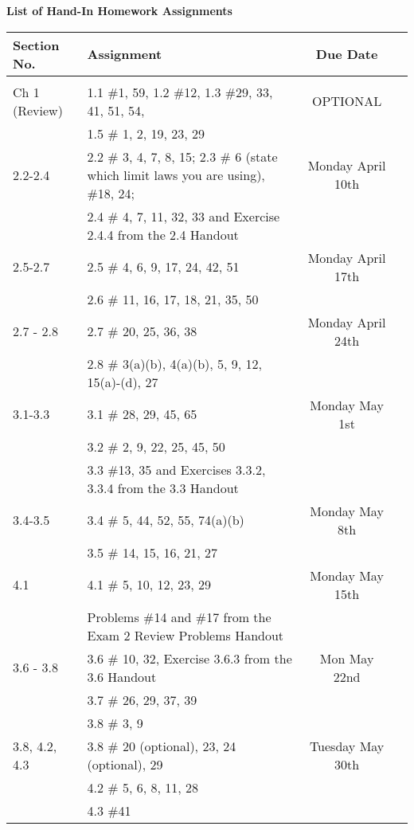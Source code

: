 \documentclass{article}
\begin{document}
\begin{center}
{\bf List of Hand-In Homework Assignments}
\end{center}

\begin{center}
\begin{tabular}{l l c l }
Section No. & Assignment  & Due Date  \\
\hline\\
Ch 1 (Review) & 1.1 \#1, 59, 1.2 \#12, 1.3 \#29, 33, 41, 51, 54,  & OPTIONAL \\
 & 1.5 \# 1, 2, 19, 23, 29 & \\
2.2-2.4 & 2.2 \# 3, 4, 7, 8, 15; 2.3 \# 6 (state which limit laws you are using), \#18, 24; & Monday April 10th \\
&  2.4 \# 4, 7, 11, 32, 33 and Exercise 2.4.4 from the 2.4 Handout   & \\

2.5-2.7 & 2.5 \# 4, 6, 9, 17, 24, 42, 51& Monday April 17th  \\
& 2.6 \# 11, 16, 17, 18, 21, 35, 50 & \\
2.7 - 2.8 &  2.7 \# 20, 25, 36, 38 & Monday April 24th \\
 & 2.8 \# 3(a)(b), 4(a)(b), 5, 9, 12, 15(a)-(d), 27 \\
  3.1-3.3 & 3.1 \# 28, 29, 45, 65  & Monday May 1st \\
   & 3.2 \# 2, 9, 22, 25, 45, 50 & \\
  & 3.3 \#13, 35 and Exercises 3.3.2, 3.3.4 from the 3.3 Handout & \\
  
   3.4-3.5 & 3.4 \# 5, 44, 52, 55, 74(a)(b) & Monday May 8th \\
    & 3.5 \# 14, 15, 16, 21, 27 &\\
    
    4.1 & 4.1 \# 5, 10, 12, 23, 29 & Monday May 15th \\
    & Problems \#14 and \#17 from the Exam 2 Review Problems Handout & \\
    
    3.6 - 3.8  & 3.6 \# 10, 32, Exercise 3.6.3 from the 3.6 Handout &Mon May 22nd \\
    & 3.7 \# 26, 29, 37, 39 & \\
& 3.8 \# 3, 9 &  \\

3.8, 4.2, 4.3 & 3.8 \#  20 (optional), 23, 24 (optional), 29 & Tuesday May 30th \\
 & 4.2 \# 5, 6, 8, 11, 28 & \\
 & 4.3 \#41 & \\
 

\end{tabular}
\end{center}
\end{document}
